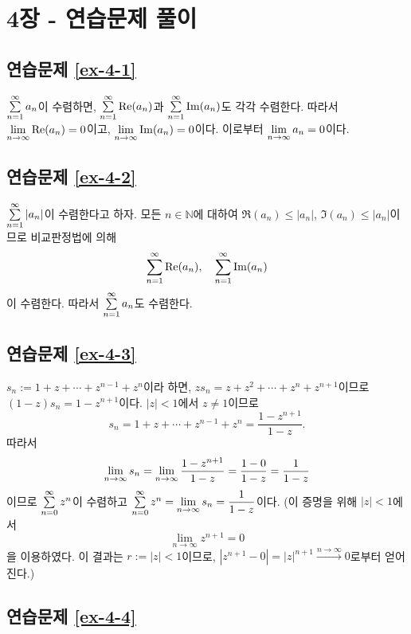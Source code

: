 
\section*{4장 - 연습문제 풀이}

\subsection*{연습문제 \ref{ex-4-1}}

$\sum\limits_{n=1}^\infty a_n$이 수렴하면,
$\sum\limits_{n=1}^\infty \Re(a_n)$과 $\sum\limits_{n=1}^\infty \Im(a_n)$도 각각 수렴한다.
따라서 $\lim\limits_{n\to\infty} \Re(a_n) = 0$이고, $\lim\limits_{n\to\infty} \Im(a_n) = 0$이다.
이로부터 $\lim\limits_{n\to\infty} a_n = 0$이다.

\subsection*{연습문제 \ref{ex-4-2}}

$\sum\limits_{n=1}^\infty |a_n|$이 수렴한다고 하자.
모든 $ n\in \mathbb N$에 대하여
$\Re(a_n) \le |a_n|$, $\Im(a_n) \le |a_n|$이므로
비교판정법에 의해
\[
\sum\limits_{n=1}^\infty \Re(a_n), \quad \sum\limits_{n=1}^\infty \Im(a_n)
\]
이 수렴한다.
따라서 $\sum\limits_{n=1}^\infty a_n$도 수렴한다.

\subsection*{연습문제 \ref{ex-4-3}}

$s_n:= 1+z+\cdots + z^{n-1}+z^n$이라 하면,
$z s_n = z + z^2 + \cdots + z^n + z^{n+1}$이므로
$(1-z)s_n = 1- z^{n+1}$이다.
$|z|<1$에서  $z\ne1$이므로
\begin{equation}\label{eq-5-21}
s_n = 1+z+\cdots + z^{n-1}+z^n = \dfrac{1-z^{n+1}}{1-z}.
\end{equation}
따라서
\[
\lim\limits_{n\to\infty} s_n = \lim_{n\to\infty}\displaystyle\frac{1-z^{n+1}}{1-z}
= \displaystyle\frac{1-0}{1-z} = \displaystyle\frac1{1-z}
\]
이므로 $\sum\limits_{n=0}^\infty z^n$이 수렴하고
$\sum\limits_{n=0}^\infty z^n = \lim\limits_{n\to\infty} s_n = \displaystyle\frac1{1-z}$이다.
(이 증명을 위해 $|z|<1$에서
\[
\lim_{n\to\infty} z^{n+1} = 0
\]
을 이용하였다.  이 결과는
$r:=|z|<1$이므로, $|z^{n+1} -0| = |z|^{n+1} \stackrel{n\to\infty}{\longrightarrow }0$로부터
얻어진다.)

\subsection*{연습문제 \ref{ex-4-4}}

